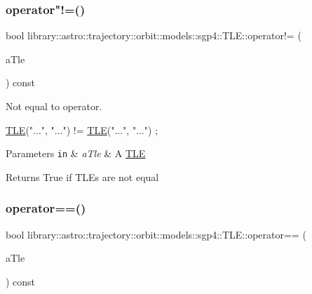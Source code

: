 \subsubsection{\texorpdfstring{operator"!=()}{operator!=()}}
{\footnotesize\ttfamily bool library\+::astro\+::trajectory\+::orbit\+::models\+::sgp4\+::\+T\+L\+E\+::operator!= (\begin{DoxyParamCaption}\item[{const \hyperlink{classlibrary_1_1astro_1_1trajectory_1_1orbit_1_1models_1_1sgp4_1_1_t_l_e}{T\+LE} \&}]{a\+Tle }\end{DoxyParamCaption}) const}



Not equal to operator. 


\begin{DoxyCode}
\hyperlink{classlibrary_1_1astro_1_1trajectory_1_1orbit_1_1models_1_1sgp4_1_1_t_l_e_a4d2b43f02cef44f0c9635daf9946261c}{TLE}(\textcolor{stringliteral}{"..."}, \textcolor{stringliteral}{"..."}) != \hyperlink{classlibrary_1_1astro_1_1trajectory_1_1orbit_1_1models_1_1sgp4_1_1_t_l_e_a4d2b43f02cef44f0c9635daf9946261c}{TLE}(\textcolor{stringliteral}{"..."}, \textcolor{stringliteral}{"..."}) ;
\end{DoxyCode}



\begin{DoxyParams}[1]{Parameters}
\mbox{\tt in}  & {\em a\+Tle} & A \hyperlink{classlibrary_1_1astro_1_1trajectory_1_1orbit_1_1models_1_1sgp4_1_1_t_l_e}{T\+LE} \\
\hline
\end{DoxyParams}
\begin{DoxyReturn}{Returns}
True if T\+L\+Es are not equal 
\end{DoxyReturn}
\mbox{\label{classlibrary_1_1astro_1_1trajectory_1_1orbit_1_1models_1_1sgp4_1_1_t_l_e_aa32fc4cf4703d3137da14da72f7dc684}} 
\subsubsection{\texorpdfstring{operator==()}{operator==()}}
{\footnotesize\ttfamily bool library\+::astro\+::trajectory\+::orbit\+::models\+::sgp4\+::\+T\+L\+E\+::operator== (\begin{DoxyParamCaption}\item[{const \hyperlink{classlibrary_1_1astro_1_1trajectory_1_1orbit_1_1models_1_1sgp4_1_1_t_l_e}{T\+LE} \&}]{a\+Tle }\end{DoxyParamCaption}) const}



